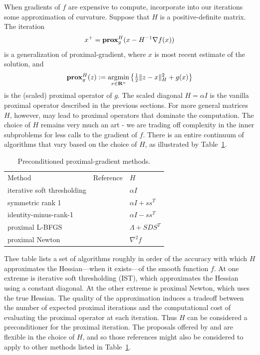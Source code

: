 When gradients of $f$ are expensive to compute, incorporate into our iterations some approximation of curvature. Suppose that $H$ is a positive-definite matrix. The iteration
\begin{equation}
  \label{eq:prox-map}
  x^{+}={\bf{prox}}^H_g(x-H^{-1}\nabla f(x))
\end{equation}
is a generalization of proximal-gradient, where $x$ is most
recent estimate of the solution, and
\begin{equation}
  \label{eq:2}
  {\bf{prox}}^H_g(z):=\underset{x\in {\mathbf{R}}^n}{\text{argmin}} 
  \left\{
  \tfrac{1}{2}\|z-x\|_H^{2}+g(x) \right\}
\end{equation}
is the (scaled) proximal operator of $g$. The scaled diagonal
$H=\alpha I$ is the vanilla proximal operator described
in the previous sections. For more general matrices $H$, however,
may lead to proximal operators that dominate the computation. The
choice of $H$ remains very much an art - we are trading off complexity
in the inner subproblems for less calls to the gradient of $f$. There is an entire
continuum of algorithms that vary based on the choice of $H$, as
illustrated by Table~\ref{tab:methods}.
\begin{table}
  \caption{Preconditioned proximal-gradient methods.}
  \centering
  \begin{tabular}{l|l|l}
    Method & Reference & $H$\\
    iterative soft thresholding & \cite{beck2009fast} & $\alpha I$
    \\symmetric rank 1 & \cite{NIPS2012_4523} & $\alpha I+ss^{T}$
    \\identity-minus-rank-1 & \cite{1401.4220}  &$\alpha I-ss^T$
    \\proximal L-BFGS &\cite{schmidt2009optimizing,NIPS2014_5384,Scheinberg2016} &$\Lambda+SDS^{T}$
    \\proximal Newton &\cite{lee2014proximal,JMLR:v16:trandihn15a,Byrd2016} & $\nabla^{2}f$
  \end{tabular}
  \label{tab:methods}
\end{table}

Thee table lists a set of algorithms roughly in order of the accuracy
with which $H$ approximates the Hessian---when it exists---of the
smooth function $f$. At one extreme is iterative soft thresholding
(IST), which approximates the Hessian using a constant diagonal. At
the other extreme is proximal Newton, which uses the true Hessian. The
quality of the approximation induces a tradeoff between the number of
expected proximal iterations and the computational cost of evaluating
the proximal operator at each iteration. Thus $H$ can be considered a
preconditioner for the proximal iteration. The proposals offered by
\cite{JMLR:v16:trandihn15a} and \cite{Byrd2016} are flexible in the
choice of $H$, and so those references might also be considered to
apply to other methods listed in Table~\ref{tab:methods}.


